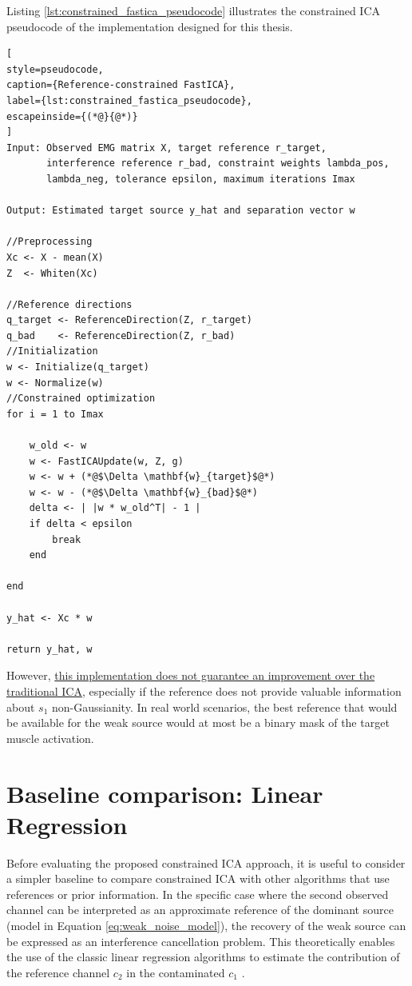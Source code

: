 Listing \ref{lst:constrained_fastica_pseudocode} illustrates the constrained ICA pseudocode of the implementation designed for this thesis.

\clearpage

\begin{lstlisting}[
style=pseudocode,
caption={Reference-constrained FastICA},
label={lst:constrained_fastica_pseudocode},
escapeinside={(*@}{@*)}
]
Input: Observed EMG matrix X, target reference r_target,
       interference reference r_bad, constraint weights lambda_pos,
       lambda_neg, tolerance epsilon, maximum iterations Imax

Output: Estimated target source y_hat and separation vector w

//Preprocessing
Xc <- X - mean(X)
Z  <- Whiten(Xc)

//Reference directions
q_target <- ReferenceDirection(Z, r_target)
q_bad    <- ReferenceDirection(Z, r_bad)
//Initialization
w <- Initialize(q_target)
w <- Normalize(w)
//Constrained optimization
for i = 1 to Imax

    w_old <- w
    w <- FastICAUpdate(w, Z, g)
    w <- w + (*@$\Delta \mathbf{w}_{target}$@*)
    w <- w - (*@$\Delta \mathbf{w}_{bad}$@*)
    delta <- | |w * w_old^T| - 1 |
    if delta < epsilon
        break
    end

end

y_hat <- Xc * w

return y_hat, w
\end{lstlisting}

However, \uline{this implementation does not guarantee an improvement over the traditional ICA}, especially if the reference does not provide valuable information about $s_1$ non-Gaussianity. In real world scenarios, the best reference that would be available for the weak source would at most be a binary mask of the target muscle activation.
\clearpage


\section{Baseline comparison: Linear Regression}


Before evaluating the proposed constrained ICA approach, it is useful to consider a simpler baseline  to compare constrained ICA with other algorithms that use references or prior information. In the specific case where the second observed channel can be interpreted as an approximate reference of the dominant source (model in Equation \ref{eq:weak_noise_model}), the recovery of the weak source can be expressed as an interference cancellation problem. This theoretically enables the use of the classic linear regression algorithms to estimate the contribution of the reference channel $c_2$ in the contaminated $c_1$ \cite{samaniego_separation_1997}.

